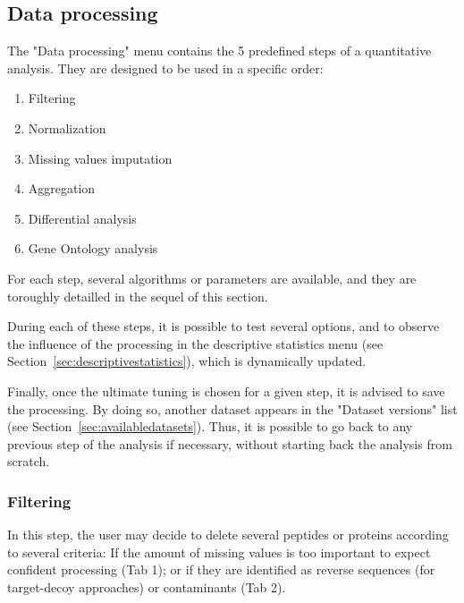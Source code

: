 \documentclass[12pt]{article}
\begin{document}
{%
\subsection{Data processing}\label{sec:processingadataset}

The "Data processing" menu contains the 5 predefined steps of a quantitative 
analysis. They are designed to be used in a specific order:
\begin{enumerate}
\item {Filtering}
\item{Normalization}
\item{Missing values imputation}
\item{Aggregation}
\item{Differential analysis}
\item{Gene Ontology analysis}
\end{enumerate}
For each step, several algorithms or parameters are available, and they are 
toroughly detailled in the sequel of this section.

During each of these steps, it is possible to test several options, and to 
observe the influence of the processing in the descriptive statistics menu 
(see Section~\ref{sec:descriptivestatistics}), which is dynamically updated. 

Finally, once the ultimate tuning is chosen for a given step, it is advised 
to save the processing. By doing so, another dataset appears in the "Dataset 
versions" list (see Section~\ref{sec:availabledatasets}). Thus, it is possible 
to go back to any previous step of the analysis if necessary, without starting 
back the analysis from scratch.

\subsubsection{Filtering}\label{sec:filtering}
{In this step, the user may decide to delete several peptides or proteins 
according to several criteria:
If the amount of missing values is too important to expect confident 
processing (Tab 1); or if they are identified as reverse sequences (for 
target-decoy approaches) or contaminants (Tab 2).}

}
\end{document}
